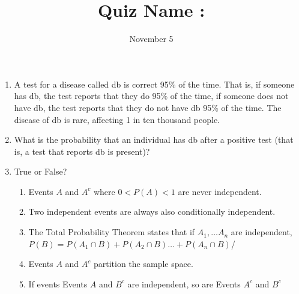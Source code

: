 \documentclass[11pt]{article}
\begin{document}
\title{Quiz \hfill Name : \underline{\hspace{3cm}}}
\date{November 5}
\maketitle
\begin{enumerate}
\item A test for a disease called db is correct 95\% of the time.  That is, if someone has db, the test reports that they do 95\% of the time, if someone does not have db, the test reports that they do not have db 95\% of the time.  The disease of db is rare, affecting 1 in ten thousand people.  
\item[] What is the probability that an individual has db after a positive test (that is, a test that reports db is present)?
\bigskip
\bigskip
\bigskip
\bigskip

\bigskip
\bigskip
\bigskip
\bigskip

\item True or False?
\begin{enumerate}
\item Events $A$ and $A^c$ where $0<P(A)<1$ are never independent.
\item Two independent events are always also conditionally independent.
\item The Total Probability Theorem states that if $A_1,\ldots A_n$ are independent, $P(B)=P(A_1\cap B)+P(A_2\cap B) \ldots+P(A_n\cap B)$/  
\item Events $A$ and $A^c$ partition the sample space.
\item If events Events $A$ and $B^c$ are independent, so are Events $A^c$ and $B^c$
\end{enumerate}


\end{enumerate}
\end{document}
